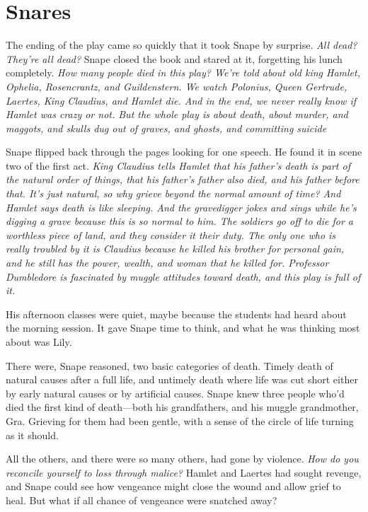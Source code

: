 
\chapter{Snares}

The ending of the play came so quickly that it took Snape by surprise. \emph{All dead? They're all dead?} Snape closed the book and stared at it, forgetting his lunch completely. \emph{How many people died in this play? We're told about old king Hamlet, Ophelia, Rosencrantz, and Guildenstern. We watch Polonius, Queen Gertrude, Laertes, King Claudius, and Hamlet die. And in the end, we never really know if Hamlet was crazy or not. But the whole play is about death, about murder, and maggots, and skulls dug out of graves, and ghosts, and committing suicide{\el}}

Snape flipped back through the pages looking for one speech. He found it in scene two of the first act. \emph{King Claudius tells Hamlet that his father's death is part of the natural order of things, that his father's father also died, and his father before that. It's just natural, so why grieve beyond the normal amount of time? And Hamlet says death is like sleeping. And the gravedigger jokes and sings while he's digging a grave because this is so normal to him. The soldiers go off to die for a worthless piece of land, and they consider it their duty. The only one who is really troubled by it is Claudius because he killed his brother for personal gain, and he still has the power, wealth, and woman that he killed for. Professor Dumbledore is fascinated by muggle attitudes toward death, and this play is full of it.}

His afternoon classes were quiet, maybe because the students had heard about the morning session. It gave Snape time to think, and what he was thinking most about was Lily.

There were, Snape reasoned, two basic categories of death. Timely death of natural causes after a full life, and untimely death where life was cut short either by early natural causes or by artificial causes. Snape knew three people who'd died the first kind of death—both his grandfathers, and his muggle grandmother, Gra. Grieving for them had been gentle, with a sense of the circle of life turning as it should.

All the others, and there were so many others, had gone by violence. \emph{How do you reconcile yourself to loss through malice?} Hamlet and Laertes had sought revenge, and Snape could see how vengeance might close the wound and allow grief to heal. But what if all chance of vengeance were snatched away?

